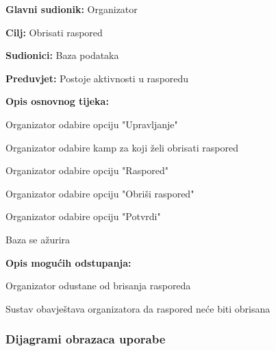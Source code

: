 					\noindent {}
					\begin{packed_item}
						
						\item \textbf{Glavni sudionik: } Organizator
						\item  \textbf{Cilj:} Obrisati raspored
						\item  \textbf{Sudionici:} Baza podataka
						\item  \textbf{Preduvjet:} Postoje aktivnosti u rasporedu	
						\item  \textbf{Opis osnovnog tijeka:}
						\item[] \begin{packed_enum}
							
							\item Organizator odabire opciju "Upravljanje"
							\item Organizator odabire kamp za koji želi obrisati raspored
							\item Organizator odabire opciju "Raspored"
							\item Organizator odabire opciju "Obriši raspored"
							\item Organizator odabire opciju "Potvrdi"
							\item Baza se ažurira
						\end{packed_enum}
						
						\item  \textbf{Opis mogućih odstupanja:}
						
						\item[] \begin{packed_item}
							
							\item[2.a] Organizator odustane od brisanja rasporeda
							\item[] \begin{packed_enum}
								
								\item Sustav obavještava organizatora da raspored neće biti obrisana

							\end{packed_enum}
						\end{packed_item}
					\end{packed_item}
			\eject	
							
			\subsubsection{Dijagrami obrazaca uporabe}
				
